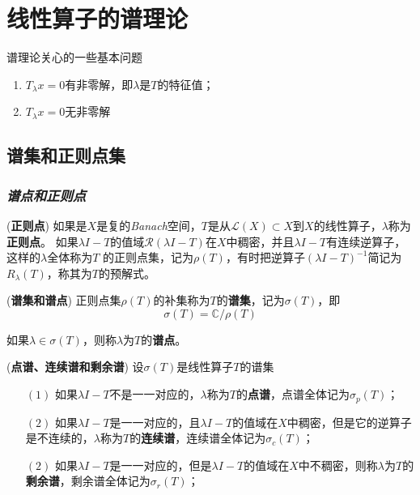 \chapter{线性算子的谱理论}

谱理论关心的一些基本问题
\begin{enumerate}[itemindent=2em]
    \item $T_\lambda x=0$有非零解，即$\lambda$是$T$的特征值；
    \item $T_\lambda x=0$无非零解
\end{enumerate}

\section{谱集和正则点集}

\subsection*{\textsl{谱点和正则点}}

\begin{define}(\textbf{正则点})
    如果是$X$是复的\textsl{Banach}空间，$T$是从$\mathcal{L}(X)\subset X$到$X$的线性算子，$\lambda$称为\textbf{正则点}。
    如果$\lambda I- T$的值域$\mathcal{R}(\lambda I-T)$在$X$中稠密，并且$\lambda I-T$有连续逆算子，这样的$\lambda$全体称为$T$
    的正则点集，记为$\rho(T)$，有时把逆算子$(\lambda I-T)^{-1}$简记为$R_\lambda(T)$，称其为$T$的预解式。
\end{define}
\vspace*{1em}

\begin{define}(\textbf{谱集和谱点})
    正则点集$\rho(T)$的补集称为$T$的\textbf{谱集}，记为$\sigma(T)$，即
    \begin{equation}
        \sigma(T)=\mathbb{C}/ \rho(T)
    \end{equation}

    如果$\lambda\in \sigma(T)$，则称$\lambda$为$T$的\textbf{谱点}。
\end{define}
\vspace*{1em}

\begin{define}(\textbf{点谱、连续谱和剩余谱})
    设$\sigma(T)$是线性算子$T$的谱集
    \begin{enumerate}[itemindent=2em]
        \item[$(1)$] 如果$\lambda I-T$不是一一对应的，$\lambda$称为$T$的\textbf{点谱}，点谱全体记为$\sigma_p(T)$；
        \item[$(2)$] 如果$\lambda I-T$是一一对应的，且$\lambda I-T$的值域在$X$中稠密，但是它的逆算子是不连续的，$\lambda$称为$T$的\textbf{连续谱}，连续谱全体记为$\sigma_c(T)$；
        \item[$(2)$] 如果$\lambda I-T$是一一对应的，但是$\lambda I-T$的值域在$X$中不稠密，则称$\lambda$为$T$的\textbf{剩余谱}，剩余谱全体记为$\sigma_r(T)$；
    \end{enumerate}
\end{define}

